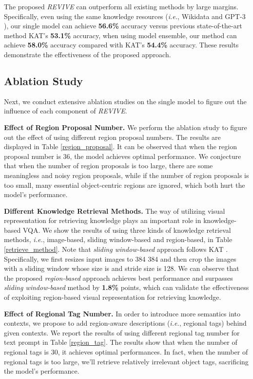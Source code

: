 \documentclass{article}
\begin{document}
The proposed \textit{REVIVE} can outperform all existing methods by large margins. Specifically, even using the same knowledge resources (\textit{i.e.}, Wikidata \cite{vrandevcic2014wikidata} and GPT-3 \cite{brown2020language}), our single model can achieve \textbf{56.6\%} accuracy versus previous state-of-the-art method KAT's \textbf{53.1\%} accuracy, when using model ensemble, our method can achieve \textbf{58.0\%} accuracy compared with KAT's \textbf{54.4\%} accuracy. These results demonstrate the effectiveness of the proposed approach.

\subsection{Ablation Study}
\label{ablation}
Next, we conduct extensive ablation studies on the single model to figure out the influence of each component of \textit{REVIVE}. 

\textbf{Effect of Region Proposal Number. } 
We perform the ablation study to figure out the effect of using different region proposal numbers. The results are displayed in Table \ref{region_proposal}. It can be observed that when the region proposal number is 36, the model achieves optimal performance. We conjecture that when the number of region proposals is too large, there are some meaningless and noisy region proposals, while if the number of region proposals is too small, many essential object-centric regions are ignored, which both hurt the model's performance.

\textbf{Different Knowledge Retrieval Methods. } The way of utilizing visual representation for retrieving knowledge plays an important role in knowledge-based VQA. We show the results of using three kinds of knowledge retrieval methods, \textit{i.e.}, image-based, sliding window-based and region-based, in Table \ref{retrieve_method}. Note that \textit{sliding window-based} approach follows KAT \cite{gui2021kat}. Specifically, we first resizes input images to 384  384 and then crop the images with a sliding window whose size is  and stride size is 128. We can observe that the proposed \textit{region-based} approach achieves best performance and surpasses \textit{sliding window-based} method by \textbf{1.8\%} points, which can validate the effectiveness of exploiting region-based visual representation for retrieving knowledge.

\textbf{Effect of Regional Tag Number. } In order to introduce more semantics into contexts, we propose to add region-aware descriptions (\textit{i.e.}, regional tags) behind given contexts. We report the results of using different regional tag number for text prompt  in Table \ref{region_tag}. The results show that when the number of regional tags is 30, it achieves optimal performances. In fact, when the number of regional tags is too large, we'll retrieve relatively irrelevant object tags, sacrificing the model's performance.
\end{document}
